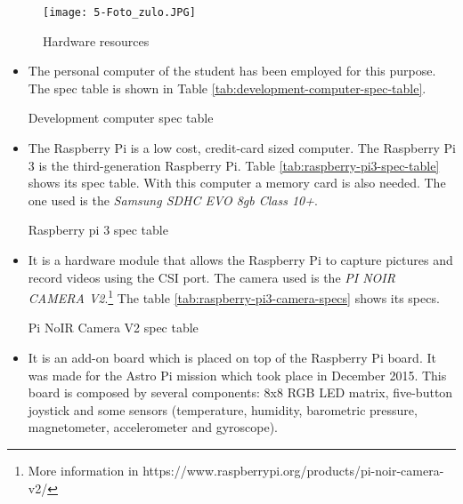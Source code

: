 \begin{figure}[!h]
	\begin{center}
		\texttt{[image: 5-Foto\_zulo.JPG]}
		\caption{Hardware resources}
		\label{fig:5-Foto_zulo}
	\end{center}
\end{figure}


\begin{itemize}
	\item {} The personal computer of the student has been employed for this purpose. The spec table is shown in Table \ref{tab:development-computer-spec-table}.
	
	\begin{table}[!h]
		\centering
		{\small
			
		}
		\caption{Development computer spec table}
		\label{tab:development-computer-spec-table}
	\end{table}
	
	\item {} The Raspberry Pi is a low cost, credit-card sized computer. The Raspberry Pi 3 is the third-generation Raspberry Pi. Table \ref{tab:raspberry-pi3-spec-table} shows its spec table. With this computer a memory card is also needed. The one used is the \emph{Samsung SDHC EVO 8gb Class 10+}.
	
	\begin{table}[!h]
		\centering
		{\small
			
		}
		\caption{Raspberry pi 3 spec table}
		\label{tab:raspberry-pi3-spec-table}
	\end{table}
	
	\item {} It is a hardware module that allows the Raspberry Pi to capture pictures and record videos using the CSI port. The camera used is the \emph{PI NOIR CAMERA V2}.\footnote{More information in https://www.raspberrypi.org/products/pi-noir-camera-v2/} The table \ref{tab:raspberry-pi3-camera-specs} shows its specs. \label{itm:Pi-camera-module-v2}
	
	\begin{table}[!h]
		\centering
		{\small
			
		}
		\caption{Pi NoIR Camera V2 spec table}
		\label{tab:raspberry-pi3-camera-specs}
	\end{table}

	\item {} It is an add-on board which is placed on top of the Raspberry Pi board. It was made for the Astro Pi mission which took place in December 2015. This board is composed by several components: 8x8 RGB LED matrix, five-button joystick and some sensors (temperature, humidity, barometric pressure, magnetometer, accelerometer and gyroscope).
	

\end{itemize}

